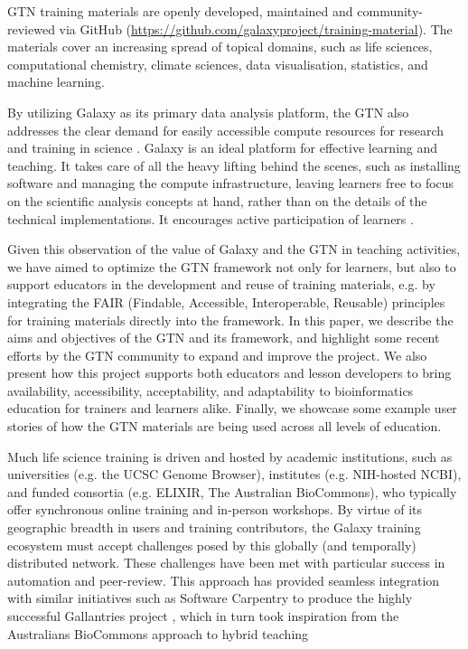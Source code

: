GTN training materials are openly developed, maintained and community-reviewed via GitHub (\url{https://github.com/galaxyproject/training-material}). 
The materials cover an increasing spread of topical domains, such as life sciences, computational chemistry, climate sciences, data visualisation, statistics, and machine learning. 

By utilizing Galaxy as its primary data analysis platform, the GTN also addresses the clear demand for easily accessible compute resources for research and training in science \cite{Barone2017}.
Galaxy is an ideal platform for effective learning and teaching. It takes care of all the heavy lifting behind the scenes, such as installing software and managing the compute infrastructure, leaving learners free to focus on the scientific analysis concepts at hand, rather than on the details of the technical implementations. It encourages active participation of learners \cite{GallardoAlba2021}.

Given this observation of the value of Galaxy and the GTN in teaching activities, we have aimed to optimize the GTN framework not only for learners, but also to support educators in the development and reuse of training materials, e.g. by integrating the FAIR (Findable, Accessible, Interoperable, Reusable) principles for training materials \cite{Garcia2020} directly into the framework. In this paper, we describe the aims and objectives of the GTN and its framework, and highlight some recent efforts by the GTN community to expand and improve the project. We also present how this project supports both educators and lesson developers to bring availability, accessibility, acceptability, and adaptability to bioinformatics education for trainers and learners alike. Finally, we showcase some example user stories of how the GTN materials are being used across all levels of education. 

Much life science training is driven and hosted by academic institutions, such as universities (e.g. the UCSC Genome Browser), institutes (e.g. NIH-hosted NCBI), and funded consortia (e.g. ELIXIR, The Australian BioCommons), who typically offer synchronous online training and in-person workshops. By virtue of its geographic breadth in users and training contributors, the Galaxy training ecosystem must accept challenges posed by this globally (and temporally) distributed network. These challenges have been met with particular success in automation and peer-review. This approach has provided seamless integration with similar initiatives such as Software Carpentry \cite{Wilson2016} to produce the highly successful Gallantries project \cite{gallantries}, which in turn took inspiration from the Australians BioCommons approach to hybrid teaching \cite{Hall2021}

